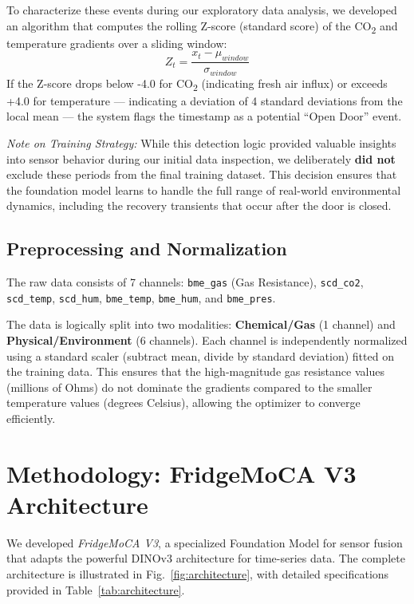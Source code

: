 \documentclass[conference]{IEEEtran}
\begin{document}
    To characterize these events during our exploratory data analysis, we developed an algorithm that computes the rolling Z-score (standard score) of the CO\textsubscript{2} and temperature gradients over a sliding window:
    \begin{equation}
        Z_t = \frac{x_t - \mu_{window}}{\sigma_{window}}
    \end{equation}
    If the Z-score drops below -4.0 for CO\textsubscript{2} (indicating fresh air influx) or exceeds +4.0 for temperature — indicating a deviation of 4 standard deviations from the local mean — the system flags the timestamp as a potential ``Open Door'' event.

    \textit{Note on Training Strategy:} While this detection logic provided valuable insights into sensor behavior during our initial data inspection, we deliberately \textbf{did not} exclude these periods from the final training dataset. This decision ensures that the foundation model learns to handle the full range of real-world environmental dynamics, including the recovery transients that occur after the door is closed.

    \subsection{Preprocessing and Normalization}
    The raw data consists of 7 channels: \texttt{bme\_gas} (Gas Resistance), \texttt{scd\_co2}, \texttt{scd\_temp}, \texttt{scd\_hum}, \texttt{bme\_temp}, \texttt{bme\_hum}, and \texttt{bme\_pres}.

    The data is logically split into two modalities: \textbf{Chemical/Gas} (1 channel) and \textbf{Physical/Environment} (6 channels). Each channel is independently normalized using a standard scaler (subtract mean, divide by standard deviation) fitted on the training data. This ensures that the high-magnitude gas resistance values (millions of Ohms) do not dominate the gradients compared to the smaller temperature values (degrees Celsius), allowing the optimizer to converge efficiently.

    \section{Methodology: FridgeMoCA V3 Architecture}

    We developed \textit{FridgeMoCA V3}, a specialized Foundation Model for sensor fusion that adapts the powerful DINOv3 architecture for time-series data. The complete architecture is illustrated in Fig.~\ref{fig:architecture}, with detailed specifications provided in Table~\ref{tab:architecture}.
\end{document}

